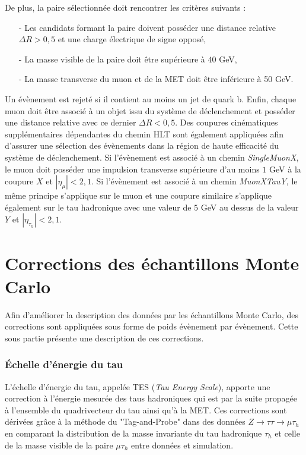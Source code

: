 De plus, la paire sélectionnée doit rencontrer les critères suivants :

\begin{itemize}
\bigskip
    \item[-] Les candidats formant la paire doivent posséder une distance relative $\Delta R>0,5$ et une charge électrique de signe opposé,
        \smallskip
    \item[-] La masse visible de la paire doit être supérieure à $40$ GeV,
        \smallskip
    \item[-] La masse transverse du muon et de la MET doit être inférieure à 50 GeV. 
    \bigskip
\end{itemize}

Un évènement est rejeté si il contient au moins un jet de quark b. Enfin, chaque muon doit être associé à un objet issu du système de déclenchement et posséder une distance relative avec ce dernier $\Delta R<0,5$. Des coupures cinématiques supplémentaires dépendantes du chemin HLT sont également appliquées afin d'assurer une sélection des évènements dans la région de haute efficacité du système de déclenchement. Si l'évènement est associé à un chemin \textit{SingleMuonX}, le muon doit posséder une impulsion transverse supérieure d'au moins $1$ GeV à la coupure $X$ et $|\eta_{\mu}|<2,1$. Si l'évènement est associé à un chemin \textit{MuonXTauY}, le même principe s'applique sur le muon et une coupure similaire s'applique également sur le tau hadronique avec une valeur de $5$ GeV au dessus de la valeur $Y$ et $|\eta_{\tau_h}|<2,1$.

\section{Corrections des échantillons Monte Carlo}

Afin d'améliorer la description des données par les échantillons Monte Carlo, des corrections sont appliquées sous forme de poids évènement par évènement. Cette sous partie présente une description de ces corrections.

\subsubsection{ Échelle d'énergie du tau}

L'échelle d'énergie du tau, appelée TES (\textit{Tau Energy Scale}), apporte une correction à l'énergie mesurée des taus hadroniques qui est par la suite propagée à l'ensemble du quadrivecteur du tau ainsi qu'à la MET. Ces corrections sont dérivées grâce à la méthode du "Tag-and-Probe" dans des données $Z\rightarrow\tau\tau\rightarrow\mu\tau_h$ en comparant la distribution de la masse invariante du tau hadronique $\tau_h$ et celle de la masse visible de la paire $\mu\tau_h$ entre données et simulation.

